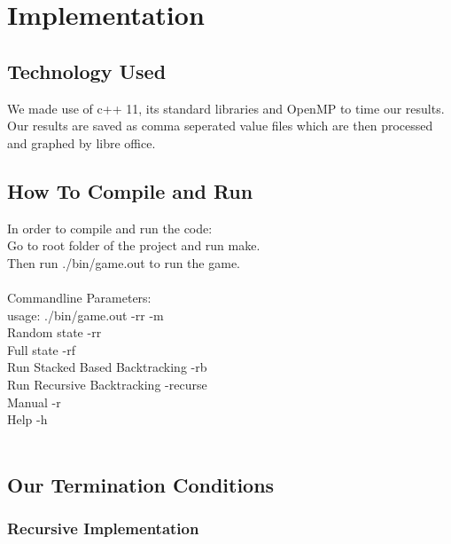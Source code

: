 \documentclass[a4paper]{article}
\begin{document}
\section{Implementation}

\subsection{Technology Used}
We made use of c++ 11, its standard libraries and OpenMP to time our results. Our results are saved as comma seperated value files which are then processed and graphed by libre office.

\subsection{How To Compile and Run}
In order to compile and run the code:\\
Go to root folder of the project and run make.\\
Then run ./bin/game.out to run the game.
\\\\
Commandline Parameters:\\
usage: ./bin/game.out -rr -m\\
Random state -rr\\
Full state -rf\\
Run Stacked Based Backtracking -rb\\
Run Recursive Backtracking -recurse\\
Manual -r\\
Help -h\\\


\subsection{Our Termination Conditions}
\subsubsection{Recursive Implementation}
\end{document}
